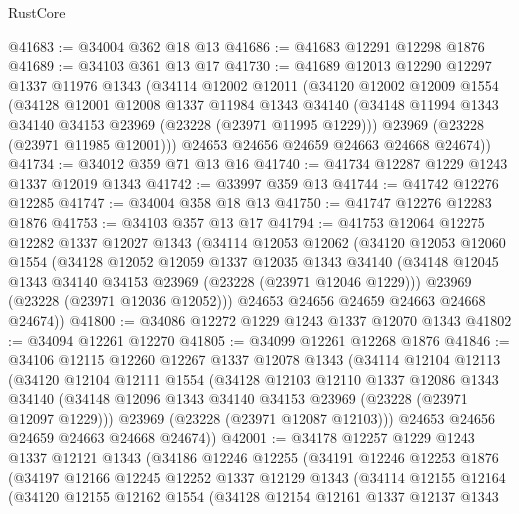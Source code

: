 \begin{lexlean}{RustCore}
\begin{coremodule}
@41683 := @34004 @362 @18 @13
@41686 := @41683 @12291 @12298 @1876
@41689 := @34103 @361 @13 @17
@41730 := @41689
    @12013
    @12290
    @12297
    @1337
    @11976
    @1343
    (@34114
      @12002
      @12011
      (@34120
        @12002
        @12009
        @1554
        (@34128
          @12001
          @12008
          @1337
          @11984
          @1343
          @34140
          (@34148 @11994 @1343 @34140 @34153 @23969 (@23228 (@23971 @11995 @1229)))
          @23969
          (@23228 (@23971 @11985 @12001)))
        @24653
        @24656
        @24659
        @24663
        @24668
        @24674))
@41734 := @34012 @359 @71 @13 @16
@41740 := @41734 @12287 @1229 @1243 @1337 @12019 @1343
@41742 := @33997 @359 @13
@41744 := @41742 @12276 @12285
@41747 := @34004 @358 @18 @13
@41750 := @41747 @12276 @12283 @1876
@41753 := @34103 @357 @13 @17
@41794 := @41753
    @12064
    @12275
    @12282
    @1337
    @12027
    @1343
    (@34114
      @12053
      @12062
      (@34120
        @12053
        @12060
        @1554
        (@34128
          @12052
          @12059
          @1337
          @12035
          @1343
          @34140
          (@34148 @12045 @1343 @34140 @34153 @23969 (@23228 (@23971 @12046 @1229)))
          @23969
          (@23228 (@23971 @12036 @12052)))
        @24653
        @24656
        @24659
        @24663
        @24668
        @24674))
@41800 := @34086 @12272 @1229 @1243 @1337 @12070 @1343
@41802 := @34094 @12261 @12270
@41805 := @34099 @12261 @12268 @1876
@41846 := @34106
    @12115
    @12260
    @12267
    @1337
    @12078
    @1343
    (@34114
      @12104
      @12113
      (@34120
        @12104
        @12111
        @1554
        (@34128
          @12103
          @12110
          @1337
          @12086
          @1343
          @34140
          (@34148 @12096 @1343 @34140 @34153 @23969 (@23228 (@23971 @12097 @1229)))
          @23969
          (@23228 (@23971 @12087 @12103)))
        @24653
        @24656
        @24659
        @24663
        @24668
        @24674))
@42001 := @34178
    @12257
    @1229
    @1243
    @1337
    @12121
    @1343
    (@34186
      @12246
      @12255
      (@34191
        @12246
        @12253
        @1876
        (@34197
          @12166
          @12245
          @12252
          @1337
          @12129
          @1343
          (@34114
            @12155
            @12164
            (@34120
              @12155
              @12162
              @1554
              (@34128
                @12154
                @12161
                @1337
                @12137
                @1343

\end{coremodule}
\end{lexlean}
